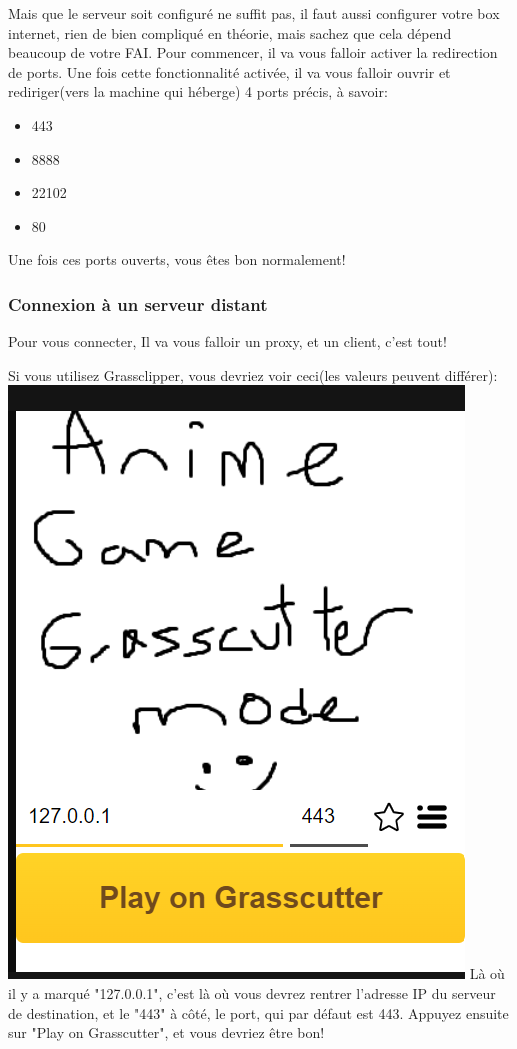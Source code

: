 \documentclass{article}
\begin{document}
Mais que le serveur soit configuré ne suffit pas, il faut aussi configurer votre box internet, rien de bien compliqué en théorie, mais sachez que cela dépend beaucoup de votre FAI.\newline
Pour commencer, il va vous falloir activer la redirection de ports. Une fois cette fonctionnalité activée, il va vous falloir ouvrir et rediriger(vers la machine qui héberge) 4 ports précis, à savoir:
\begin{itemize}
	\item 443
	\item 8888
	\item 22102
	\item 80
\end{itemize}
Une fois ces ports ouverts, vous êtes bon normalement!

\subsubsection{Connexion à un serveur distant}
Pour vous connecter, Il va vous falloir un proxy, et un client, c'est tout!\newline\newline

Si vous utilisez Grassclipper, vous devriez voir ceci(les valeurs peuvent différer):\newline
\includegraphics[scale=0.8]{img/grassclipper_co.png}\newline
Là où il y a marqué "127.0.0.1", c'est là où vous devrez rentrer l'adresse IP du serveur de destination, et le "443" à côté, le port, qui par défaut est 443.\newline
Appuyez ensuite sur "Play on Grasscutter", et vous devriez être bon!\newline\newline
\end{document}
